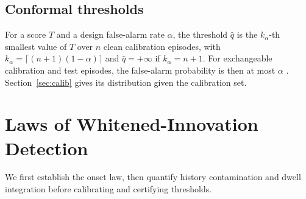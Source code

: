 \documentclass[journal]{IEEEtran}
\begin{document}
\subsection{Conformal thresholds}
For a score $T$ and a design false-alarm rate $\alpha$, the threshold $\widehat q$ is the $k_\alpha$-th smallest value of $T$ over $n$ clean calibration episodes, with $k_\alpha=\lceil(n+1)(1-\alpha)\rceil$ and $\widehat q=+\infty$ if $k_\alpha=n+1$. For exchangeable calibration and test episodes, the false-alarm probability is then at most $\alpha$ \cite{lei2018,bates2023}. Section~\ref{sec:calib} gives its distribution given the calibration set.

\section{Laws of Whitened-Innovation Detection}\label{sec:laws}
We first establish the onset law, then quantify history contamination and dwell integration before calibrating and certifying thresholds.
\end{document}
